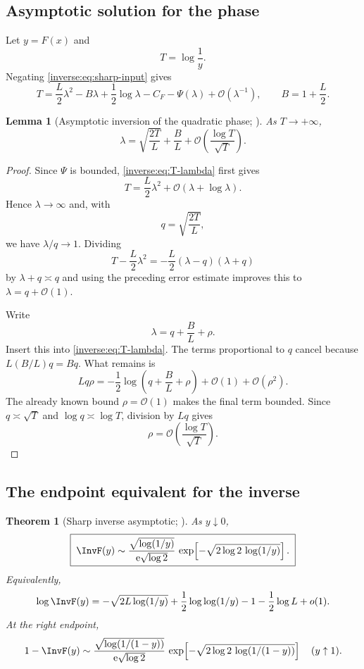 \documentclass[11pt,oneside]{article}
\newtheorem{theorem}{Theorem}[section]
\newtheorem{lemma}[lemma]{Lemma}
\theoremstyle{definition}
\theoremstyle{remark}
\newcommand{\e}{\mathrm e}
\newcommand{\bigO}{\mathcal O}
\begin{document}
\subsection{Asymptotic solution for the phase}

Let $y=F(x)$ and
\[
 T=\log\frac1y.
\]
Negating \eqref{inverse:eq:sharp-input} gives
\begin{equation}
 T=\frac L2\lambda^2-B\lambda+\frac12\log\lambda
     -C_F-\Psi(\lambda)+\bigO(\lambda^{-1}),
 \qquad B=1+\frac L2. \label{inverse:eq:T-lambda}
\end{equation}

\begin{lemma}[Asymptotic inversion of the quadratic phase; \Derived]
\label{inverse:lem:lambda-from-T}
As $T\to+\infty$,
\[
 \lambda
 =\sqrt{\frac{2T}{L}}+\frac BL
   +\bigO\!\left(\frac{\log T}{\sqrt T}\right).
\]
\end{lemma}

\begin{proof}
Since $\Psi$ is bounded, \eqref{inverse:eq:T-lambda} first gives
\[
 T=\frac L2\lambda^2+\bigO(\lambda+\log\lambda).
\]
Hence $\lambda\to\infty$ and, with
\[
 q=\sqrt{\frac{2T}{L}},
\]
we have $\lambda/q\to1$.  Dividing
\[
 T-\frac L2\lambda^2
 =-\frac L2(\lambda-q)(\lambda+q)
\]
by $\lambda+q\asymp q$ and using the preceding error estimate improves
this to $\lambda=q+\bigO(1)$.

Write
\[
 \lambda=q+\frac BL+\rho.
\]
Insert this into \eqref{inverse:eq:T-lambda}.  The terms proportional to $q$
cancel because $L(B/L)q=Bq$.  What remains is
\[
 Lq\rho
 =-\frac12\log\!\left(q+\frac BL+\rho\right)+\bigO(1)
   +\bigO(\rho^2).
\]
The already known bound $\rho=\bigO(1)$ makes the final term bounded.
Since $q\asymp\sqrt T$ and $\log q\asymp\log T$, division by $Lq$ gives
\[
 \rho=\bigO\!\left(\frac{\log T}{\sqrt T}\right).
\]
\end{proof}

\subsection{The endpoint equivalent for the inverse}

\begin{theorem}[Sharp inverse asymptotic; \Derived]
\label{inverse:thm:sharp-inverse-asymptotic}
As $y\downarrow0$,
\begin{equation}
 \boxed{\;
 \InvF(y)\sim
 \frac{\sqrt{\log(1/y)}}{\e\sqrt{\log2}}\,
 \exp\!\left[-\sqrt{2\log2\,\log(1/y)}\right].
 \;} \label{inverse:eq:sharp-inverse}
\end{equation}
Equivalently,
\begin{equation}
 \log\InvF(y)
 =-\sqrt{2L\log(1/y)}
  +\frac12\log\log(1/y)
  -1-\frac12\log L+o(1). \label{inverse:eq:log-sharp-inverse}
\end{equation}
At the right endpoint,
\begin{equation}
 1-\InvF(y)\sim
 \frac{\sqrt{\log(1/(1-y))}}{\e\sqrt{\log2}}\,
 \exp\!\left[-\sqrt{2\log2\,\log(1/(1-y))}\right]
 \quad(y\uparrow1). \label{inverse:eq:right-inverse-asymptotic}
\end{equation}
\end{theorem}
\end{document}
